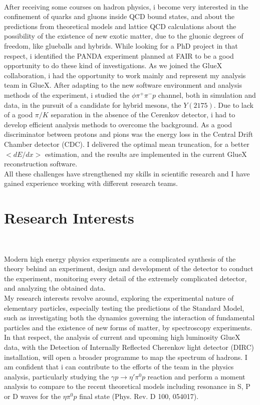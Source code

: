 \documentclass[a4paper,roman]{article}
\begin{document}
~\par After receiving some courses on hadron physics, i become very interested in the confinement of quarks and gluons inside QCD bound states, and about the predictions from theoretical models and lattice QCD calculations about the possibility of the existence of new exotic matter, due to the gluonic degrees of freedom, like glueballs and hybrids. While looking for a PhD project in that respect, i identified the PANDA experiment planned at FAIR to be a good opportunity to do these kind of investigations. As we joined the GlueX collaboration, i had the opportunity to work mainly and represent my analysis team in GlueX. After adapting to the new software environment and analysis methods of the experiment, i studied the $\phi\pi^{+}\pi^{-}p$ channel, both in simulation and data, in the pursuit of a candidate for hybrid mesons, the $Y(2175)$. Due to lack of a good $\pi/K$ separation in the absence of the Cerenkov detector, i had to develop efficient analysis methods to overcome the background. As a good discriminator between protons and pions was the energy loss in the Central Drift Chamber detector (CDC). I delivered the optimal mean truncation, for a better $<dE/dx>$ estimation, and the results are implemented in the current GlueX reconstruction software.\\
All these challenges have strengthened my skills in scientific research and I have gained experience working with different research teams.

\section*{Research Interests}
~\par Modern high energy physics experiments are a complicated synthesis of the theory behind an experiment, design and development of the detector to conduct the experiment, monitoring every detail of the extremely complicated detector, and analyzing the obtained data.\\
My research interests revolve around, exploring the experimental nature of elementary particles, especially testing the predictions of the Standard Model, such as investigating both the dynamics governing the interaction of fundamental particles and the existence of new forms of matter, by spectroscopy experiments.\\
In that respect, the analysis of current and upcoming high luminosity GlueX data, with the Detection of Internally Reflected Cherenkov light detector (DIRC) installation, will open a broader programme to map the spectrum of hadrons. I am confident that i can contribute to the efforts of the team in the physics analysis, particularly studying the $\gamma p \rightarrow \eta' \pi^{0} p$ reaction and perform a moment analysis to compare to the recent theoretical models including resonance in S, P or D waves for the $\eta \pi^{0} p$ final state (Phys. Rev. D 100, 054017).
\end{document}
